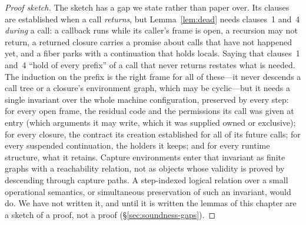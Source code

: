 \begin{proof}[Proof sketch]
The sketch has a gap we state rather than paper over. Its clauses are established when a call
\emph{returns}, but Lemma~\ref{lem:dead} needs clauses~1 and~4 \emph{during} a call: a callback runs while
its caller's frame is open, a recursion may not return, a returned closure carries a promise about calls
that have not happened yet, and a fiber parks with a continuation that holds locals. Saying that clauses~1
and~4 ``hold of every prefix'' of a call that never returns restates what is needed. The induction on the
prefix is the right frame for all of these---it never descends a call tree or a closure's environment
graph, which may be cyclic---but it needs a single invariant over the whole machine configuration,
preserved by every step: for every open frame, the residual code and the permissions its call was given at
entry (which arguments it may write, which it was supplied owned or exclusive); for every closure, the
contract its creation established for all of its future calls; for every suspended continuation, the
holders it keeps; and for every runtime structure, what it retains. Capture environments enter that
invariant as finite graphs with a reachability relation, not as objects whose validity is proved by
descending through capture paths. A step-indexed logical relation over a small operational semantics, or
simultaneous preservation of such an invariant, would do. We have not written it, and until it is written
the lemmas of this chapter are a sketch of a proof, not a proof (\S\ref{sec:soundness-gaps}).
\end{proof}

